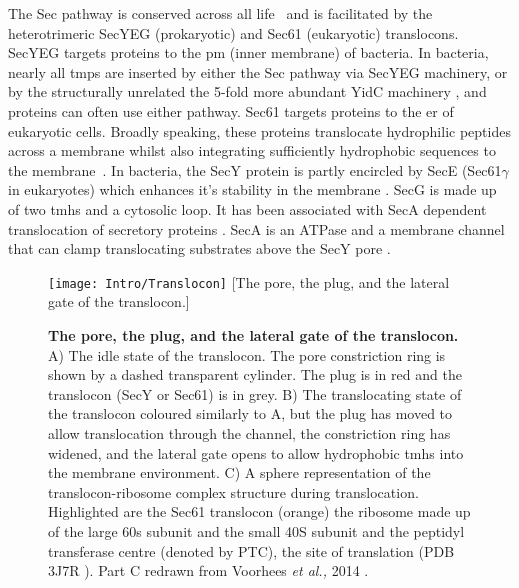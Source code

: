 The Sec pathway is conserved across all life~\cite{Cao2003} and is facilitated by the heterotrimeric SecYEG (prokaryotic) and Sec61 (eukaryotic) translocons.
SecYEG targets proteins to the \gls{pm} (inner membrane) of bacteria.
In bacteria, nearly all \gls{tmp}s are inserted by either the Sec pathway via  SecYEG machinery, or by the structurally unrelated the 5\--fold more abundant YidC machinery \cite{Drew2003, Dalbey2014}, and proteins can often use either pathway.
Sec61 targets proteins to the \gls{er} of eukaryotic cells.
Broadly speaking, these proteins translocate hydrophilic peptides across a membrane whilst also integrating sufficiently hydrophobic sequences to the membrane~\cite{Junne2010, Park2012, Shao2011, Cymer2015}.
In bacteria, the SecY protein is partly encircled by SecE (Sec61$\gamma$ in eukaryotes) which enhances it's stability in the membrane \cite{Kihara1995}.
SecG is made up of two \gls{tmh}s and a cytosolic loop.
It has been associated with SecA dependent translocation of secretory proteins \cite{Duong1997, Koch2000}.
SecA is an ATPase and a membrane channel that can clamp translocating substrates above the SecY pore \cite{Zimmer2008}.

\begin{figure}[ht!]
\centering
\texttt{[image: Intro/Translocon]}
	 [The pore, the plug, and the lateral gate of the translocon.]{\textbf{The pore, the plug, and the lateral gate of the translocon.}
	 A) The idle state of the translocon.
	 The pore constriction ring is shown by a dashed transparent cylinder.
	 The plug is in red and the translocon (SecY or Sec61) is in grey.
	 B) The translocating state of the translocon coloured similarly to A, but the plug has moved to allow translocation through the channel, the constriction ring has widened, and the lateral gate opens to allow hydrophobic \gls{tmh}s into the membrane environment.
	 C) A sphere representation of the translocon-ribosome complex structure during translocation.
	 Highlighted are the Sec61 translocon (orange) the ribosome made up of the large 60s subunit and the small 40S subunit and the peptidyl transferase centre (denoted by PTC), the site of translation (PDB 3J7R \cite{Voorhees2014}).
	 Part C redrawn from Voorhees \textit{et al.,} 2014 \cite{Voorhees2014}.

	 }
\label{fig:Translocon}
\end{figure}

